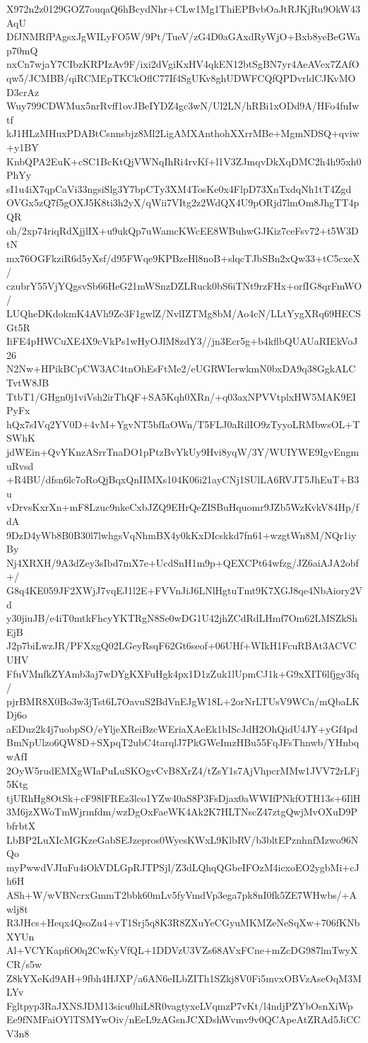 X972n2z0129GOZ7ouqaQ6hBcydNhr+CLw1Mg1ThiEPBvbOaJtRJKjRu9OkW43AqU
DfJNMRfPAgsxJgWILyFO5W/9Pt/TueV/zG4D0aGAxdRyWjO+Bxb8yeBeGWap70mQ
nxCn7wjaY7CIbzKRPIzAv9F/ixi2dVgiKxHV4qkEN12btSgBN7yr4AeAVex7ZAfO
qw5/JCMBB/qiRCMEpTKCkOflC77If4SgUKv8ghUDWFCQfQPDvrldCJKvMOD3crAz
Wuy799CDWMux5nrRvff1ovJBeIYDZ4gc3wN/Ul2LN/hRBi1xODd9A/HFo4fuIwtf
kJ1HLzMHuxPDABtCsnnsbjz8Ml2LigAMXAnthohXXrrMBe+MgmNDSQ+qviw+y1BY
KnbQPA2EuK+cSC1BcKtQjVWNqIhRi4rvKf+l1V3ZJmqvDkXqDMC2h4h95xh0PhYy
sI1u4iX7qpCaVi33ngsiSlg3Y7bpCTy3XM4TosKe0x4FlpD73XnTxdqNh1tT4Zgd
OVGx5zQ7f5gOXJ5K8ti3h2yX/qWii7VItg2z2WdQX4U9pORjd7lmOm8JhgTT4pQR
oh/2xp74riqRdXjjlIX+u9ukQp7uWamcKWcEE8WBuhwGJKiz7ceFsv72+t5W3DtN
mx76OGFkziR6d5yXsf/d95FWqe9KPBzeHl8noB+slqcTJbSBn2xQw33+tC5cxeX/
czubrY55VjYQgsvSb66HeG21mWSnzDZLRuck0bS6iTNt9rzFHx+orfIG8qrFmWO/
LUQheDKdokmK4AVh9Ze3F1gwlZ/NvlIZTMg8bM/Ao4cN/LLtYygXRq69HECSGt5R
IiFE4pHWCuXE4X9cVkPs1wHyOJlM8zdY3//jn3Ecr5g+b4kflbQUAUaRIEkVoJ26
N2Nw+HPikBCpCW3AC4tnOhEsFtMe2/eUGRWIerwkmN0bxDA9q38GgkALCTvtW8JB
TtbT1/GHgn0j1viVsh2irThQF+SA5Kqh0XRn/+q03axNPVVtplxHW5MAK9EIPyFx
hQx7sIVq2YV0D+4vM+YgvNT5bfIaOWn/T5FLJ0aRilIO9zTyyoLRMbwsOL+TSWhK
jdWEin+QvYKnzASrrTnaDO1pPtzBvYkUy9Hvi8yqW/3Y/WUIYWE9IgvEngmuRvsd
+R4BU/dfsn6lc7oRoQjBqxQnIIMXs104K06i21ayCNj1SUlLA6RVJT5JhEuT+B3u
vDrvsKxrXn+mF8Lzuc9nkeCxbJZQ9EHrQeZISBuHquomr9JZb5WzKvkV84Hp/fdA
9DzD4yWb8B0B30l7lwhgsVqNhmBX4y0kKxDIcskkd7fn61+wzgtWn8M/NQr1iyBy
Nj4XRXH/9A3dZey3sIbd7mX7e+UcdSnH1m9p+QEXCPt64wfzg/JZ6aiAJA2obf+/
G8q4KE059JF2XWjJ7vqEJ1l2E+FVVnJiJ6LNlHgtuTmt9K7XGJ8qe4NbAiory2Vd
y30jiuJB/e4iT0mtkFhcyYKTRgN8Se0wDG1U42jhZCdRdLHmf7Om62LMSZkShEjB
J2p7biLwzJR/PFXxgQ02LGeyRsqF62Gt6seof+06UHf+WIkH1FcuRBAt3ACVCUHV
FfuVMnfkZYAmb3aj7wDYgKXFuHgk4px1D1zZuk1lUpmCJ1k+G9xXIT6lfjgy3fq/
pjrBMR8X0Bo3w3jTst6L7OavuS2BdVnEJgW18L+2orNrLTUsV9WCn/mQbaLKDj6o
aEDuz2k4j7uobpSO/eYljeXReiBzcWEriaXAeEk1bIScJdH2OhQidU4JY+yGf4pd
BmNpUlzo6QW8D+SXpqT2ubC4tarqlJ7PkGWeImzHBu55FqJFsThnwb/YHnbqwAfI
2OyW5rudEMXgWIaPuLuSKOgvCvB8XrZ4/tZsY1s7AjVhpcrMMw1JVV72rLFj5Ktg
tjURhHg8OtSk+cF98lFREz3lco1YZw40aS8P3FsDjax0aWWIfPNkfOTH13s+6IlH
3M6jzXWoTmWjrmfdm/wzDgOxFaeWK4Ak2K7HLTNscZ47ztgQwjMvOXuD9PbfrbtX
LbBP2LuXIcMGKzeGabSEJzepros0WyesKWxL9KlbRV/b3bltEPznhnfMzwo96NQo
myPwwdVJIuFu4iOkVDLGpRJTPSjl/Z3dLQhqQGbeIFOzM4icxoEO2ygbMi+cJh6H
ASh+W/wVBNcrxGmmT2bbk60mLv5fyVmdVp3ega7pk8nI0fk5ZE7WHwbs/+Awlj8t
R3JHcs+Heqx4QsoZu4+vT1Srj5q8K3R8ZXuYeCGyuMKMZeNeSqXw+706fKNbXYUn
Al+VCYKapfiO0q2CwKyVfQL+1DDVzU3VZs68AVxFCne+mZcDG987lmTwyXCR/s5w
Z8kYXeKd9AH+9fbh4HJXP/a6AN6eILbZITh1SZkj8V0Fi5mvxOBVzAseOqM3MLYv
Fgltpyp3RaJXNSJDM13sicu0hiL8R0vagtyxeLVqmzP7vKt/l4ndjPZYbOsnXiWp
Ee9fNMFaiOYlTSMYwOiv/nEeL9zAGsnJCXDshWvmv9v0QCApeAtZRAd5JiCCV3n8
